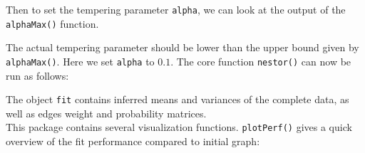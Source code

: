 \begin{Shaded}
\begin{Highlighting}[]
\StringTok{ }\OperatorTok{\$}\NormalTok{ )}
\end{Highlighting}
\end{Shaded}

Then to set the tempering parameter \texttt{alpha}, we can look at the
output of the \texttt{alphaMax()} function.

\begin{Shaded}
\begin{Highlighting}[]
\OperatorTok{+}
\end{Highlighting}
\end{Shaded}

The actual tempering parameter should be lower than the upper bound
given by \texttt{alphaMax()}. Here we set \texttt{alpha} to \(0.1\). The
core function \texttt{nestor()} can now be run as follows:

\begin{Shaded}
\begin{Highlighting}[]
\StringTok{ }\OperatorTok{\$}\NormalTok{, }\NormalTok{, }
           \NormalTok{)}
\CommentTok{#> }
\end{Highlighting}
\end{Shaded}

The object \texttt{fit} contains inferred means and variances of the
complete data, as well as edges weight and probability matrices.\\

This package contains several visualization functions.
\texttt{plotPerf()} gives a quick overview of the fit performance
compared to initial graph:

\begin{Shaded}
\begin{Highlighting}[]
\OperatorTok{\$}\OperatorTok{\$}\NormalTok{)}
\end{Highlighting}
\end{Shaded}

